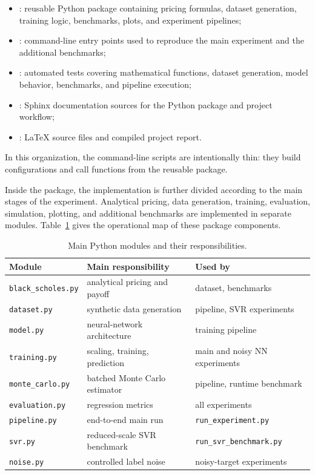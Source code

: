 \begin{itemize}
    \item {}:
    reusable Python package containing pricing formulas, dataset generation, training logic, benchmarks, plots, and experiment pipelines;
    \item {}:
    command-line entry points used to reproduce the main experiment and the additional benchmarks;
    \item {}:
    automated tests covering mathematical functions, dataset generation, model behavior, benchmarks, and pipeline execution;
    \item {}:
    Sphinx documentation sources for the Python package and project workflow;
    \item {}:
    \LaTeX{} source files and compiled project report.
\end{itemize}
In this organization, the command-line scripts are intentionally thin: they build configurations and call functions from the reusable package.

Inside the package, the implementation is further divided according to the main stages of the experiment.
Analytical pricing, data generation, training, evaluation, simulation, plotting, and additional benchmarks are implemented in separate modules.
Table~\ref{tab:software-modules} gives the operational map of these package components.

\begin{table}[H]
    \centering
    \begin{tabular}{lll}
        \toprule
        Module & Main responsibility & Used by \\
        \midrule
        \texttt{black\_scholes.py} & analytical pricing and payoff & dataset, benchmarks \\
        \texttt{dataset.py} & synthetic data generation & pipeline, SVR experiments \\
        \texttt{model.py} & neural-network architecture & training pipeline \\
        \texttt{training.py} & scaling, training, prediction & main and noisy NN experiments \\
        \texttt{monte\_carlo.py} & batched Monte Carlo estimator & pipeline, runtime benchmark \\
        \texttt{evaluation.py} & regression metrics & all experiments \\
        \texttt{pipeline.py} & end-to-end main run & \texttt{run\_experiment.py} \\
        \texttt{svr.py} & reduced-scale SVR benchmark & \texttt{run\_svr\_benchmark.py} \\
        \texttt{noise.py} & controlled label noise & noisy-target experiments \\
        \bottomrule
    \end{tabular}
    \caption{Main Python modules and their responsibilities.}
    \label{tab:software-modules}
\end{table}

